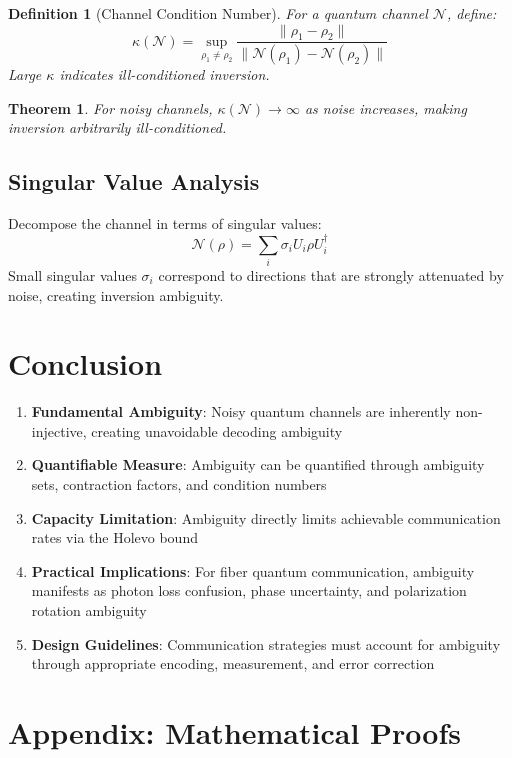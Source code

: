 \documentclass[12pt]{article}
\newtheorem{theorem}{Theorem}
\newtheorem{definition}{Definition}
\begin{document}
\begin{definition}[Channel Condition Number]
For a quantum channel $\mathcal{N}$, define:
\[
\kappa(\mathcal{N}) = \sup_{\rho_1 \neq \rho_2} \frac{\|\rho_1 - \rho_2\|}{\|\mathcal{N}(\rho_1) - \mathcal{N}(\rho_2)\|}
\]
Large $\kappa$ indicates ill-conditioned inversion.
\end{definition}

\begin{theorem}
For noisy channels, $\kappa(\mathcal{N}) \to \infty$ as noise increases, making inversion arbitrarily ill-conditioned.
\end{theorem}

\subsection{Singular Value Analysis}
Decompose the channel in terms of singular values:
\[
\mathcal{N}(\rho) = \sum_i \sigma_i U_i \rho U_i^\dagger
\]
Small singular values $\sigma_i$ correspond to directions that are strongly attenuated by noise, creating inversion ambiguity.

\section{Conclusion}

\begin{enumerate}
    \item \textbf{Fundamental Ambiguity}: Noisy quantum channels are inherently non-injective, creating unavoidable decoding ambiguity
    \item \textbf{Quantifiable Measure}: Ambiguity can be quantified through ambiguity sets, contraction factors, and condition numbers
    \item \textbf{Capacity Limitation}: Ambiguity directly limits achievable communication rates via the Holevo bound
    \item \textbf{Practical Implications}: For fiber quantum communication, ambiguity manifests as photon loss confusion, phase uncertainty, and polarization rotation ambiguity
    \item \textbf{Design Guidelines}: Communication strategies must account for ambiguity through appropriate encoding, measurement, and error correction
\end{enumerate}

\section*{Appendix: Mathematical Proofs}
\end{document}
